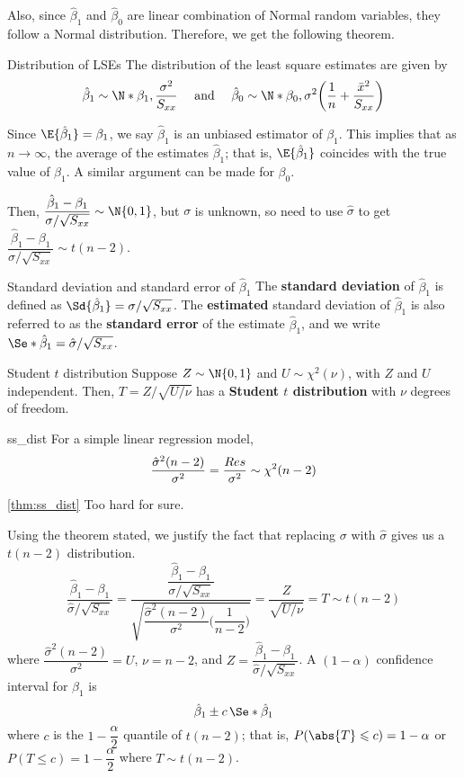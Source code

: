 Also, since $ \hat{\beta}_1 $ and $ \hat{\beta}_0 $
are linear combination of Normal random variables,
they follow a Normal distribution. Therefore, we get the following theorem.
\begin{Theorem}{Distribution of LSEs}{}
  The distribution of the least square estimates are given by
  \[ \hat{\beta}_1\sim
    \N*{\beta_1,\frac{\sigma^2}{S_{xx}}}\quad\text{ and }\quad
    \hat{\beta}_0
    \sim \N*{\beta_0,\sigma^2
      \biggl(\frac{1}{n}+\frac{\bar{x}^2}{S_{xx}}\biggr)} \]
\end{Theorem}
Since $ \E{\hat{\beta}_1}=\beta_1 $,
we say $ \hat{\beta}_1 $ is an unbiased
estimator of $ \beta_1 $. This implies
that as $ n\to\infty $, the average
of the estimates $ \hat{\beta}_1 $; that is,
$ \E{\hat{\beta}_1} $ coincides with the true
value of $ \beta_1 $. A similar argument can be made for $ \beta_0 $.

Then, $ \dfrac{\hat{\beta}_1-\beta_1}{\sigma/\sqrt{S_{xx}}} \sim \N{0,1} $,
but $ \sigma $ is unknown, so need to use $ \hat{\sigma} $
to get
$ \dfrac{\hat{\beta}_1-\beta_1}{\hat{\sigma}/\sqrt{S_{xx}}}
  \sim t(n-2) $.
\begin{Definition}{Standard deviation and standard error of $ \hat{\beta}_1 $}{}
  The \textbf{standard deviation} of $ \hat{\beta}_1 $
  is defined as $ \Sd{\hat{\beta}_1}=\sigma/\sqrt{S_{xx}} $.
  The \textbf{estimated} standard deviation of $ \hat{\beta}_1 $
  is also referred to as the \textbf{standard error}
  of the estimate $ \hat{\beta}_1 $, and
  we write $ \Se*{\hat{\beta}_1}=\hat{\sigma}/\sqrt{S_{xx}} $.
\end{Definition}
\begin{Definition}{Student $ t $ distribution}{}
  Suppose $ Z \sim \N{0,1} $
  and $ U \sim \chi^2(\nu) $,
  with $ Z $ and $ U $ independent. Then,
  $ T=Z/\sqrt{U/\nu} $ has a \textbf{Student $t$ distribution}
  with $ \nu $ degrees of freedom.
\end{Definition}
\begin{Theorem}{}{ss_dist}
  For a simple linear regression model,
  \[ \frac{\hat{\sigma}^2(n-2)}{\sigma^2}=\frac{\relax{Res}}{\sigma^2}
    \sim \chi^2(n-2) \]
\end{Theorem}
\begin{Proof}{\ref{thm:ss_dist}}{}
  Too hard for sure.
\end{Proof}
Using the theorem stated, we justify
the fact that replacing $ \sigma $ with $ \hat{\sigma} $
gives us a $ t(n-2) $ distribution.
\[ \frac{\hat{\beta}_1-\beta_1}{\hat{\sigma}/\sqrt{S_{xx}}}
  =\dfrac{\dfrac{\hat{\beta}_1-\beta_1}{\sigma/\sqrt{S_{xx}}}}{
    \sqrt{\dfrac{\hat{\sigma}^2(n-2)}{\sigma^2}\biggl( \dfrac{1}{n-2} \biggr)}
  }=
  \frac{Z}{\sqrt{U/\nu}}=T \sim t(n-2)  \]
where $ \dfrac{\hat{\sigma}^2(n-2)}{\sigma^2}=U $,
$ \nu=n-2 $, and $ Z=\dfrac{\hat{\beta}_1-\beta_1}{\hat{\sigma}/\sqrt{S_{xx}}} $.
A $ (1-\alpha) $ confidence interval for $ \beta_1 $ is
\[ \hat{\beta}_1\pm c\,\Se*{\hat{\beta}_1} \]
where $ c $ is the $ 1-\dfrac{\alpha}{2} $ quantile
of $ t(n-2) $; that is,
$ P(\abs{T}\leqslant c)=1-\alpha $ or
$ P(T\leqslant c)=1-\dfrac{\alpha}{2} $
where $ T \sim t(n-2) $.

